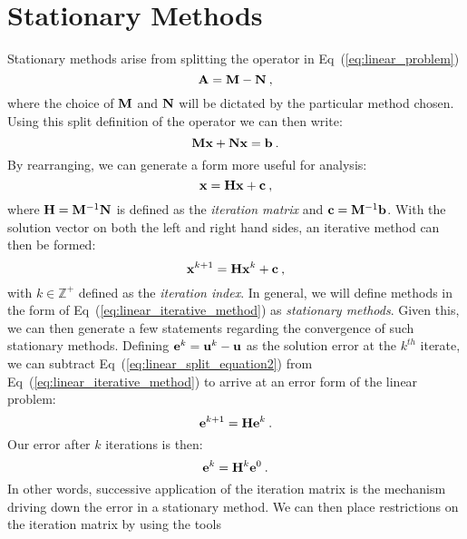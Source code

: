 \section{Stationary Methods}
\label{sec:stationary_methods}
Stationary methods arise from splitting the operator in
Eq~(\ref{eq:linear_problem})
\begin{equation}
  \mathbf{A} = \mathbf{M} - \mathbf{N}\:,
  \label{eq:split_linear_operator}
\end{equation}
where the choice of $\mathbf{M}$ and $\mathbf{N}$ will be dictated by the
particular method chosen. Using this split definition of the operator
we can then write:
\begin{equation}
  \mathbf{M}\mathbf{x} + \mathbf{N}\mathbf{x} = \mathbf{b}\:.
  \label{eq:linear_split_equation1}
\end{equation}
By rearranging, we can generate a form more useful for analysis:
\begin{equation}
  \mathbf{x} = \mathbf{H}\mathbf{x} + \mathbf{c}\:,
  \label{eq:linear_split_equation2}
\end{equation}
where $\mathbf{H}=\mathbf{M}^{-1}\mathbf{N}$ is defined as the \textit{iteration
  matrix} and $\mathbf{c}=\mathbf{M}^{-1}\mathbf{b}$. With the solution vector on
both the left and right hand sides, an iterative method can then be
formed:
\begin{equation}
    \mathbf{x}^{k+1} = \mathbf{H}\mathbf{x}^k + \mathbf{c}\:,
  \label{eq:linear_iterative_method}
\end{equation}
with $k \in \mathbb{Z}^+$ defined as the \textit{iteration index}. In
general, we will define methods in the form of
Eq~(\ref{eq:linear_iterative_method}) as \textit{stationary
  methods}. Given this, we can then generate a few statements
regarding the convergence of such stationary methods. Defining
$\mathbf{e}^k = \mathbf{u}^k - \mathbf{u}$ as the solution error at the
$k^{th}$ iterate, we can subtract Eq~(\ref{eq:linear_split_equation2})
from Eq~(\ref{eq:linear_iterative_method}) to arrive at an error form
of the linear problem:
\begin{equation}
  \mathbf{e}^{k+1} = \mathbf{H}\mathbf{e}^k\:. 
  \label{eq:linear_iterative_error}
\end{equation}
Our error after $k$ iterations is then:
\begin{equation}
  \mathbf{e}^{k} = \mathbf{H}^k\mathbf{e}^0\:. 
  \label{eq:linear_k_iter_error}
\end{equation}
In other words, successive application of the iteration matrix is the
mechanism driving down the error in a stationary method. We can then
place restrictions on the iteration matrix by using the tools
